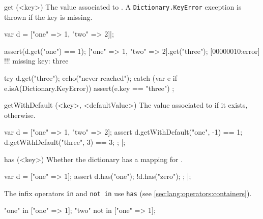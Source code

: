 \begin{urbiscriptapi}

\item[get](<key>)%
  The value associated to .  A \lstinline|Dictionary.KeyError|
  exception is thrown if the key is missing.
\begin{urbiscript}
var d = ["one" => 1, "two" => 2]|;

assert(d.get("one") == 1);
["one" => 1, "two" => 2].get("three");
[00000010:error] !!! missing key: three

try
{
  d.get("three");
  echo("never reached");
}
catch (var e if e.isA(Dictionary.KeyError))
{
  assert(e.key == "three")
};
\end{urbiscript}


\item[getWithDefault](<key>, <defaultValue>)%
  The value associated to  if it exists, 
  otherwise.

\begin{urbiscript}
{
  var d = ["one" => 1, "two" => 2];
  assert
  {
    d.getWithDefault("one",  -1) == 1;
    d.getWithDefault("three", 3) == 3;
  };
}|;
\end{urbiscript}


\item[has](<key>)%
  Whether the dictionary has a mapping for .

\begin{urbiscript}
{
  var d = ["one" => 1];
  assert
  {
    d.has("one");
    !d.has("zero");
  };
}|;
\end{urbiscript}

  The infix operators \lstinline|in| and \lstinline|not in| use
  \lstinline|has| (see \autoref{sec:lang:operators:containers}).

\begin{urbiassert}
"one" in     ["one" => 1];
"two" not in ["one" => 1];
\end{urbiassert}



\end{urbiscriptapi}
